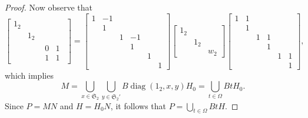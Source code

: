 \documentclass[12pt]{amsart}
\newcommand{\diag}{\operatorname{diag}}
\theoremstyle{Theorem}
\theoremstyle{Theorem}
\theoremstyle{Theorem}
\theoremstyle{Theorem}
\theoremstyle{Plain}
\theoremstyle{remark}
\theoremstyle{remark}
\theoremstyle{Definition}
\begin{document}
\begin{proof}
    Now observe that
    \[
        \begin{bmatrix}
            1_2 &   &     \\
                &1_2&     \\
                &   &
            \begin{matrix}
                0 & 1\\
                1 & 1
            \end{matrix}
        \end{bmatrix}
        =
        \begin{bmatrix}
            1 & -1 &   &    &   &  \\
              & 1  &   &    &   &  \\
              &    & 1 & -1 &   &  \\
              &    &   & 1  &   &  \\
              &    &   &    & 1 &  \\
              &    &   &    &   & 1
        \end{bmatrix}
        \begin{bmatrix}
            1_2 &     &    \\
                & 1_2 &    \\
                &     & w_2
        \end{bmatrix}
        \begin{bmatrix}
            1 & 1 &   &   &   &  \\
              & 1 &   &   &   &  \\
              &   & 1 & 1 &   &  \\
              &   &   & 1 &   &  \\
              &   &   &   & 1 & 1\\
              &   &   &   &   & 1
        \end{bmatrix}
        ,
    \]
    which implies
    \[
        M = \bigcup_{ x \in \mathfrak{S}_2 } \bigcup_{ y \in \mathfrak{S}_2' } B \diag( 1_2, x, y ) H_0 = \bigcup_{ t \in \Omega } BtH_0.
    \]
    Since $ P = MN $ and $ H = H_0N $, it follows that $ P = \bigcup_{ t \in \Omega } BtH $.
\end{proof}
\end{document}
